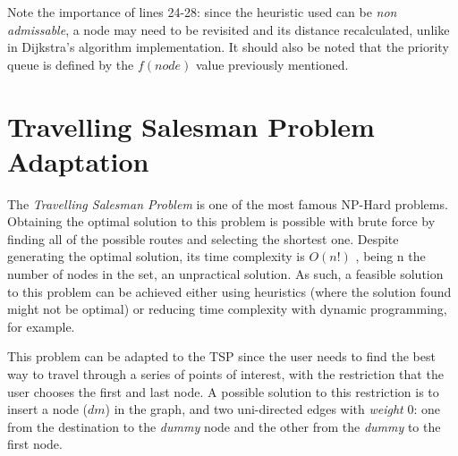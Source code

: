 \documentclass[a4paper, 12pt]{report}
\begin{document}
    Note the importance of lines 24-28: since the heuristic used can be \textit{non admissable}, a node may need to be revisited and its distance recalculated, unlike in Dijkstra's algorithm implementation. It should also be noted that the priority queue is defined by the $f(node)$ value previously mentioned.
    
    \pagebreak
    
    \section{Travelling Salesman Problem Adaptation} \label{tspa}
    
    The \textit{Travelling Salesman Problem} is one of the most famous NP-Hard problems\cite{skienna1}. Obtaining the optimal solution to this problem is possible with brute force by finding all of the possible routes and selecting the shortest one. Despite generating the optimal solution, its time complexity is $O(n!)$ \cite{acmtsp}, being n the number of nodes in the set, an unpractical solution. As such, a feasible solution to this problem can be achieved either using heuristics (where the solution found might not be optimal) or reducing time complexity with dynamic programming, for example.
    
    This problem can be adapted to the TSP since the user needs to find the best way to travel through a series of points of interest, with the restriction that the user chooses the first and last node. A possible solution to this restriction is to insert a node ($dm$) in the graph, and two uni-directed edges with \textit{weight} 0: one from the destination to the \textit{dummy} node and the other from the \textit{dummy} to the first node.
\end{document}
